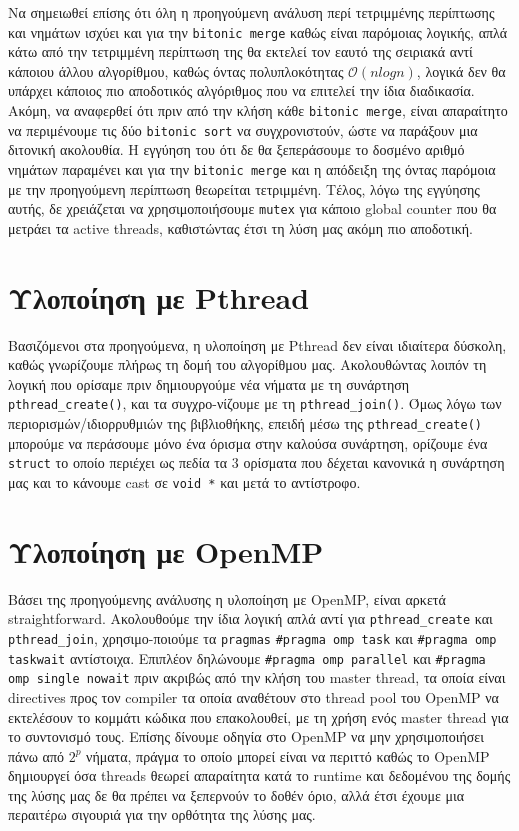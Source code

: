 \documentclass[11pt,a4paper,titlepage]{article}
\begin{document}
		Να σημειωθεί επίσης ότι όλη η προηγούμενη ανάλυση περί τετριμμένης περίπτωσης και νημάτων ισχύει και για την \verb|bitonic merge| καθώς είναι παρόμοιας λογικής, απλά κάτω από την τετριμμένη περίπτωση της θα εκτελεί τον εαυτό της σειριακά αντί κάποιου άλλου αλγορίθμου, καθώς όντας πολυπλοκότητας $\mathcal{O}(nlogn)$, λογικά δεν θα υπάρχει κάποιος πιο αποδοτικός αλγόριθμος που να επιτελεί την ίδια διαδικασία. Ακόμη, να αναφερθεί ότι πριν από την κλήση κάθε \verb|bitonic merge|, είναι απαραίτητο να περιμένουμε τις δύο \verb|bitonic sort| να συγχρονιστούν, ώστε να παράξουν μια διτονική ακολουθία. Η εγγύηση του ότι δε θα ξεπεράσουμε το δοσμένο αριθμό νημάτων παραμένει και για την \verb|bitonic merge| και η απόδειξη της όντας παρόμοια με την προηγούμενη περίπτωση θεωρείται τετριμμένη. Τέλος, λόγω της εγγύησης αυτής, δε χρειάζεται να χρησιμοποιήσουμε \verb|mutex| για κάποιο global counter που θα μετράει τα active threads, καθιστώντας έτσι τη λύση μας ακόμη πιο αποδοτική.
	
	\section{Υλοποίηση με Pthread}		
		Βασιζόμενοι στα προηγούμενα, η υλοποίηση με Pthread δεν είναι ιδιαίτερα δύσκολη, καθώς γνωρίζουμε πλήρως τη δομή του αλγορίθμου μας. Ακολουθώντας λοιπόν τη λογική που ορίσαμε πριν δημιουργούμε νέα νήματα με τη συνάρτηση \verb|pthread_create()|, και τα συγχρο-νίζουμε με τη \verb|pthread_join()|. Όμως λόγω των περιορισμών/ιδιορρυθμιών της βιβλιοθήκης, επειδή μέσω της \verb|pthread_create()| μπορούμε να περάσουμε μόνο ένα όρισμα στην καλούσα συνάρτηση, ορίζουμε ένα \verb|struct| το οποίο περιέχει ως πεδία τα 3 ορίσματα που δέχεται κανονικά η συνάρτηση μας και το κάνουμε cast σε \verb|void *| και μετά το αντίστροφο.
		
	\section{Υλοποίηση με OpenMP}
		Βάσει της προηγούμενης ανάλυσης η υλοποίηση με OpenMP, είναι αρκετά straightforward. Ακολουθούμε την ίδια λογική απλά αντί για \verb|pthread_create| και \verb|pthread_join|, χρησιμο-ποιούμε τα \verb|pragmas| \verb|#pragma omp task| και \verb|#pragma omp taskwait| αντίστοιχα. Επιπλέον δηλώνουμε \verb|#pragma omp parallel| και \verb|#pragma omp single nowait| πριν ακριβώς από την κλήση του master thread, τα οποία είναι directives προς τον compiler τα οποία αναθέτουν στο thread pool του OpenMP να εκτελέσουν το κομμάτι κώδικα που επακολουθεί, με τη χρήση ενός master thread για το συντονισμό τους. Επίσης δίνουμε οδηγία στο OpenMP να μην χρησιμοποιήσει πάνω από $2^p$ νήματα, πράγμα το οποίο μπορεί είναι να περιττό καθώς το OpenMP δημιουργεί όσα threads θεωρεί απαραίτητα κατά το runtime και δεδομένου της δομής της λύσης μας δε θα πρέπει να ξεπερνούν το δοθέν όριο, αλλά έτσι έχουμε μια περαιτέρω σιγουριά για την ορθότητα της λύσης μας.\\
		
\end{document}

